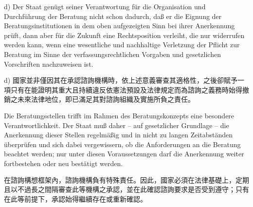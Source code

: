 \documentclass[12pt]{article}
\begin{document}
\begin{sourcepara}[title={原文D.127}]
d) Der Staat genügt seiner Verantwortung für die Organisation und Durchführung der Beratung nicht schon dadurch, daß er die Eignung der Beratungsinstitutionen in dem oben aufgezeigten Sinn bei ihrer Anerkennung prüft, dann aber für die Zukunft eine Rechtsposition verleiht, die nur widerrufen werden kann, wenn eine wesentliche und nachhaltige Verletzung der Pflicht zur Beratung im Sinne der verfassungsrechtlichen Vorgaben und gesetzlichen Vorschriften nachzuweisen ist.
\end{sourcepara}
\begin{transpara}
d) 國家並非僅因其在承認諮詢機構時，依上述意義審查其適格性，之後卻賦予一項只有在能證明其重大且持續違反依憲法預設及法律規定而為諮詢之義務時始得撤銷之未來法律地位，即已滿足其對諮詢組織及實施所負之責任。
\end{transpara}

\begin{sourcepara}[title={原文D.128}]
Die Beratungsstellen trifft im Rahmen des Beratungskonzepts eine besondere Verantwortlichkeit. Der Staat muß daher -- auf gesetzlicher Grundlage -- die Anerkennung dieser Stellen regelmäßig und in nicht zu langen Zeitabständen überprüfen und sich dabei vergewissern, ob die Anforderungen an die Beratung beachtet werden; nur unter diesen Voraussetzungen darf die Anerkennung weiter fortbestehen oder neu bestätigt werden.
\end{sourcepara}
\begin{transpara}
在諮詢構想框架內，諮詢機構負有特殊責任。因此，國家必須在法律基礎上，定期且以不過長之間隔審查此等機構之承認，並在此確認諮詢要求是否受到遵守；只有在此等前提下，承認始得繼續存在或重新確認。
\end{transpara}
\end{document}
